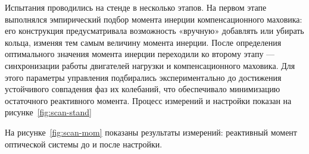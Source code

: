  Испытания проводились на стенде в несколько этапов. На первом этапе выполнялся эмпирический подбор момента инерции компенсационного маховика: его конструкция предусматривала возможность «вручную» добавлять или убирать кольца, изменяя тем самым величину момента инерции. После определения оптимального значения момента инерции переходили ко второму этапу — синхронизации работы двигателей нагрузки и компенсационного маховика. Для этого параметры управления подбирались экспериментально до достижения устойчивого совпадения фаз их колебаний, что обеспечивало минимизацию остаточного реактивного момента. Процесс измерений и настройки показан на рисунке~\cref{fig:scan-stand} 
 
 На рисунке~\cref{fig:scan-mom} показаны результаты измерений: реактивный момент оптической системы до и после настройки.
 
